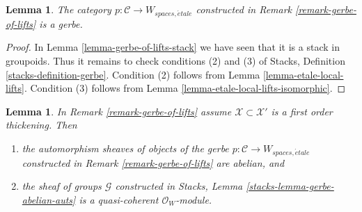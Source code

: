 \documentclass{stacks-project}
\theoremstyle{plain}
\newtheorem{lemma}[subsection]{Lemma}
\theoremstyle{definition}
\theoremstyle{remark}
\numberwithin{equation}{subsection}
\def\etale{{\acute{e}tale}}
\begin{document}
\begin{lemma}
\label{lemma-gerbe-of-lifts}
The category $p : \mathcal{C} \to W_{spaces, \etale}$ constructed
in Remark \ref{remark-gerbe-of-lifts} is a gerbe.
\end{lemma}

\begin{proof}
In Lemma \ref{lemma-gerbe-of-lifts-stack}
we have seen that it is a stack in groupoids.
Thus it remains to check conditions (2) and (3) of
Stacks, Definition \ref{stacks-definition-gerbe}.
Condition (2) follows from
Lemma \ref{lemma-etale-local-lifts}.
Condition (3) follows from
Lemma \ref{lemma-etale-local-lifts-isomorphic}.
\end{proof}

\begin{lemma}
\label{lemma-gerbe-of-lifts-first-order}
In Remark \ref{remark-gerbe-of-lifts} assume $\mathcal{X} \subset \mathcal{X}'$
is a first order thickening. Then
\begin{enumerate}
\item the automorphism sheaves of objects of the gerbe
$p : \mathcal{C} \to W_{spaces, \etale}$ constructed
in Remark \ref{remark-gerbe-of-lifts} are abelian, and
\item the sheaf of groups $\mathcal{G}$ constructed in
Stacks, Lemma \ref{stacks-lemma-gerbe-abelian-auts}
is a quasi-coherent $\mathcal{O}_W$-module.
\end{enumerate}
\end{lemma}
\end{document}
